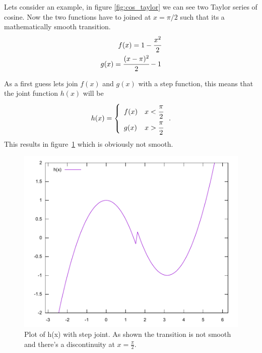 \documentclass[11pt,DIV=10,final]{scrreprt} %
\begin{document}
{Lets consider an example, in figure \ref{fig:cos_taylor} we can see two Taylor series of cosine. Now the two functions have to joined at $x = \pi / 2$ such that its a mathematically smooth transition.
\begin{align}
  \label{joint:f}
  f(x) = 1 - \cfrac{x^{2}}{2} \\
  \label{joint:g}
  g(x) = \cfrac{(x - \pi)^{2}}{2} -  1
\end{align}

As a first guess lets join $f(x)$ and $g(x)$ with a step function, this means that the joint function $h(x)$ will be
\[
  h(x) =  \left\{
    \begin{array}{ll}
           f(x) & x < \cfrac{\pi}{2} \\
           g(x) & x > \cfrac{\pi}{2}
    \end{array}
    \right..
\]
This results in figure~\ref{fig:joint-step} which is obviously not smooth.
\begin{figure}[H]
  \centering
  \includegraphics[width=.9\textwidth]{plots/step_joint.pdf}
  \caption{Plot of h(x) with step joint. As shown the transition is not smooth and there's a discontinuity at $x = \frac{\pi}{2}$.}\label{fig:joint-step}
\end{figure}

}
\end{document}
